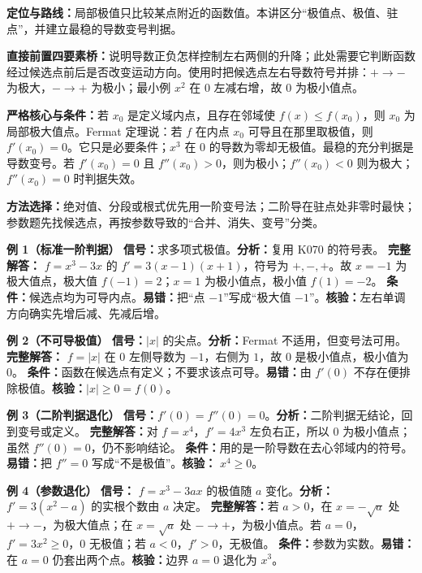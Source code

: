 \begin{knowledgeBox}
\textbf{定位与路线：}局部极值只比较某点附近的函数值。本讲区分“极值点、极值、驻点”，并建立最稳的导数变号判据。

\textbf{直接前置四要素桥：}说明导数正负怎样控制左右两侧的升降；此处需要它判断函数经过候选点前后是否改变运动方向。使用时把候选点左右导数符号并排：\( +\to-\) 为极大，\(-\to+\) 为极小；最小例 \(x^2\) 在 \(0\) 左减右增，故 \(0\) 为极小值点。

\textbf{严格核心与条件：}若 \(x_0\) 是定义域内点，且存在邻域使 \(f(x)\le f(x_0)\)，则 \(x_0\) 为局部极大值点。Fermat 定理说：若 \(f\) 在内点 \(x_0\) 可导且在那里取极值，则 \(f'(x_0)=0\)。它只是必要条件；\(x^3\) 在 \(0\) 的导数为零却无极值。最稳的充分判据是导数变号。若 \(f'(x_0)=0\) 且 \(f''(x_0)>0\)，则为极小；\(f''(x_0)<0\) 则为极大；\(f''(x_0)=0\) 时判据失效。

\textbf{方法选择：}绝对值、分段或根式优先用一阶变号法；二阶导在驻点处非零时最快；参数题先找候选点，再按参数导致的“合并、消失、变号”分类。

\textbf{例 1（标准一阶判据）}\quad
\textbf{信号：}求多项式极值。\textbf{分析：}复用 K070 的符号表。
\textbf{完整解答：} \(f=x^3-3x\) 的 \(f'=3(x-1)(x+1)\)，符号为 \(+,-,+\)。故 \(x=-1\) 为极大值点，极大值 \(f(-1)=2\)；\(x=1\) 为极小值点，极小值 \(f(1)=-2\)。
\textbf{条件：}候选点均为可导内点。\textbf{易错：}把“点 \(-1\)”写成“极大值 \(-1\)”。\textbf{核验：}左右单调方向确实先增后减、先减后增。

\textbf{例 2（不可导极值）}\quad
\textbf{信号：}\(|x|\) 的尖点。\textbf{分析：}Fermat 不适用，但变号法可用。
\textbf{完整解答：} \(f=|x|\) 在 \(0\) 左侧导数为 \(-1\)，右侧为 \(1\)，故 \(0\) 是极小值点，极小值为 \(0\)。
\textbf{条件：}函数在候选点有定义；不要求该点可导。\textbf{易错：}由 \(f'(0)\) 不存在便排除极值。\textbf{核验：}\(|x|\ge0=f(0)\)。

\textbf{例 3（二阶判据退化）}\quad
\textbf{信号：}\(f'(0)=f''(0)=0\)。\textbf{分析：}二阶判据无结论，回到变号或定义。
\textbf{完整解答：}对 \(f=x^4\)，\(f'=4x^3\) 左负右正，所以 \(0\) 为极小值点；虽然 \(f''(0)=0\)，仍不影响结论。
\textbf{条件：}用的是一阶导数在去心邻域内的符号。\textbf{易错：}把 \(f''=0\) 写成“不是极值”。\textbf{核验：} \(x^4\ge0\)。

\textbf{例 4（参数退化）}\quad
\textbf{信号：} \(f=x^3-3ax\) 的极值随 \(a\) 变化。\textbf{分析：} \(f'=3(x^2-a)\) 的实根个数由 \(a\) 决定。
\textbf{完整解答：}若 \(a>0\)，在 \(x=-\sqrt a\) 处 \(+\to-\)，为极大值点；在 \(x=\sqrt a\) 处 \(-\to+\)，为极小值点。若 \(a=0\)，\(f'=3x^2\ge0\)，\(0\) 无极值；若 \(a<0\)，\(f'>0\)，无极值。
\textbf{条件：}参数为实数。\textbf{易错：}在 \(a=0\) 仍套出两个点。\textbf{核验：}边界 \(a=0\) 退化为 \(x^3\)。


\end{knowledgeBox}
